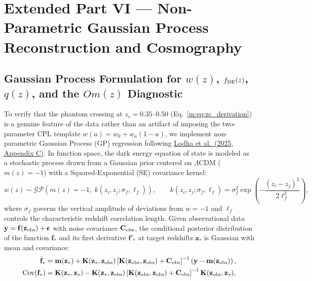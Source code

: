 \documentclass[aps,prd,preprint,superscriptaddress,nofootinbib]{revtex4-2}
\begin{document}


\section{Extended Part VI --- Non-Parametric Gaussian Process Reconstruction and Cosmography}

\subsection{Gaussian Process Formulation for $w(z)$, $f_{\rm DE}(z)$, $q(z)$, and the $Om(z)$ Diagnostic}

To verify that the phantom crossing at $z_c = 0.35\text{--}0.50$ (Eq.~\ref{m:eq:zc_derivation}) is a genuine feature of the data rather than an artifact of imposing the two-parameter CPL template $w(a) = w_0 + w_a(1-a)$, we implement non-parametric Gaussian Process (GP) regression following \href{https://arxiv.org/abs/2503.14743}{Lodha et al.\ (2025, Appendix C)}. In function space, the dark energy equation of state is modeled as a stochastic process drawn from a Gaussian prior centered on $\Lambda$CDM ($m(z) = -1$) with a Squared-Exponential (SE) covariance kernel:
\begin{equation}
    w(z) \sim \mathcal{GP}\!\left( m(z) = -1,\; k(z_i, z_j; \sigma_f, \ell_f) \right), \qquad k(z_i, z_j; \sigma_f, \ell_f) = \sigma_f^2 \exp\!\left( -\frac{(z_i - z_j)^2}{2 \ell_f^2} \right),
    \label{m:eq:gp_kernel}
\end{equation}
where $\sigma_f$ governs the vertical amplitude of deviations from $w=-1$ and $\ell_f$ controls the characteristic redshift correlation length. Given observational data $\mathbf{y} = \mathbf{f}(\mathbf{z}_{\rm obs}) + \boldsymbol{\epsilon}$ with noise covariance $\mathbf{C}_{\rm obs}$, the conditional posterior distribution of the function $\mathbf{f}_*$ and its first derivative $\mathbf{f}'_*$ at target redshifts $\mathbf{z}_*$ is Gaussian with mean and covariance:
\begin{align}
    \bar{\mathbf{f}}_* &= \mathbf{m}(\mathbf{z}_*) + \mathbf{K}(\mathbf{z}_*, \mathbf{z}_{\rm obs}) \left[ \mathbf{K}(\mathbf{z}_{\rm obs}, \mathbf{z}_{\rm obs}) + \mathbf{C}_{\rm obs} \right]^{-1} \left( \mathbf{y} - \mathbf{m}(\mathbf{z}_{\rm obs}) \right), \label{m:eq:gp_mean} \\
    \text{Cov}(\mathbf{f}_*) &= \mathbf{K}(\mathbf{z}_*, \mathbf{z}_*) - \mathbf{K}(\mathbf{z}_*, \mathbf{z}_{\rm obs}) \left[ \mathbf{K}(\mathbf{z}_{\rm obs}, \mathbf{z}_{\rm obs}) + \mathbf{C}_{\rm obs} \right]^{-1} \mathbf{K}(\mathbf{z}_{\rm obs}, \mathbf{z}_*), \label{m:eq:gp_cov}
\end{align}
\end{document}
